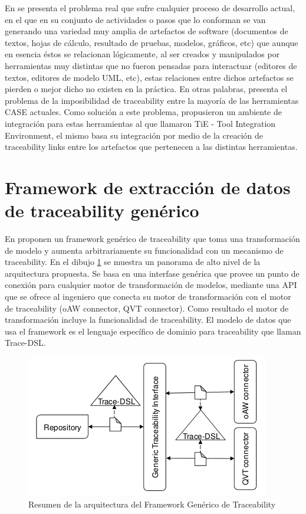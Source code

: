 \documentclass[a4paper,12pt,oneside]{book}
\begin{document}
En \cite{KlarRoseSchurr} se presenta el problema real que sufre cualquier proceso de desarrollo actual, en el que en su conjunto de actividades o pasos que lo conforman se van generando una variedad muy amplia de artefactos de software (documentos de textos, hojas de cálculo, resultado de pruebas, modelos, gráficos, etc) que aunque en esencia éstos se relacionan lógicamente, al ser creados y manipulados por herramientas muy distintas que no fueron pensadas para interactuar (editores de textos, editores de modelo UML, etc), estas relaciones entre dichos artefactos se pierden o mejor dicho no existen en la práctica. En otras palabras, presenta el problema de la imposibilidad de traceability entre la mayoría de las herramientas CASE actuales. Como solución a este problema, propusieron un ambiente de integración para estas herramientas  al que llamaron TiE - Tool Integration Environment, el mismo basa su integración por medio de la creación de traceability links entre los artefactos que pertenecen a las distintas herramientas.

\section{Framework de extracción de datos de traceability genérico}

En \cite{GrammelKastenholz} proponen un framework genérico de traceability que toma una transformación de modelo y aumenta arbitrariamente su funcionalidad con un mecanismo de traceability. En el dibujo \ref{fig:GenericoArquitectura} se muestra un panorama de alto nivel de la arquitectura propuesta. Se basa en una interfase genérica que provee un punto de conexión para cualquier motor de transformación de modelos, mediante una API que se ofrece al ingeniero que conecta su motor de transformación con el motor de traceability (oAW connector, QVT connector). Como resultado el motor de transformación incluye la funcionalidad de traceability. El modelo de datos que usa el framework es el lenguaje específico de dominio para traceability que llaman Trace-DSL.

\begin{figure}[hbtp]
\centering
\includegraphics[scale=.7]{./img/GenericTraceFrame_Arquitectura}
\caption{Resumen de la arquitectura del Framework Genérico de Traceability}
\label{fig:GenericoArquitectura}
\end{figure}
\end{document}
